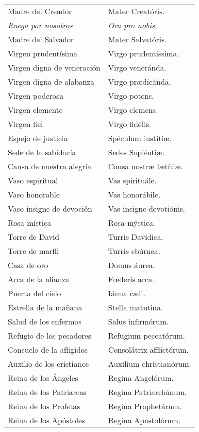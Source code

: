 \documentclass[./00_main.tex]{subfiles}
\begin{document}
\begin{longtable} { p{} p{} }
    Madre del Creador & Mater Creatóris.\\
    \textit{\color{red}Ruega por nosotros} & \textit{\color{red}Ora pro nobis}.\\
    Madre del Salvador & Mater Salvatóris.\\
    Virgen prudentísima & Virgo prudentíssima.\\
    Virgen digna de veneración & Virgo veneránda.\\
    Virgen digna de alabanza & Virgo pr{\ae}dicánda.\\
    Virgen poderosa & Virgo potens.\\
    Virgen clemente & Virgo clemens.\\
    Virgen fiel & Virgo fidélis.\\
    Espejo de justicia & Spéculum iustítiæ.\\
    Sede de la sabiduría & Sedes Sapiéntiæ.\\
    Causa de nuestra alegría & Causa nostræ l{\ae}títiæ.\\
    Vaso espiritual & Vas spirituále.\\
    Vaso honorable & Vas honorábile.\\
    Vaso insigne de devoción & Vas insigne devotiónis.\\
    Rosa mística & Rosa mýstica.\\
    Torre de David & Turris Davídica.\\
    Torre de marfil & Turris ebúrnea.\\
    Casa de oro & Domus áurea.\\
    Arca de la alianza & F{\oe}deris arca.\\
    Puerta del cielo & Iánua cæli.\\
    Estrella de la mañana & Stella matutina.\\
    Salud de los enfermos & Salus infirmórum.\\
    Refugio de los pecadores & Refugium peccatórum.\\
    Consuelo de la afligidos & Consolátrix afflictórum.\\
    Auxilio de los cristianos & Auxílium christianórum.\\
    Reina de los Ángeles & Regina Angelórum.\\
    Reina de los Patriarcas & Regina Patriarchánum.\\
    Reina de los Profetas & Regina Prophetárum.\\
    Reina de los Apóstoles & Regina Apostolórum.\\

\end{longtable}
\end{document}
